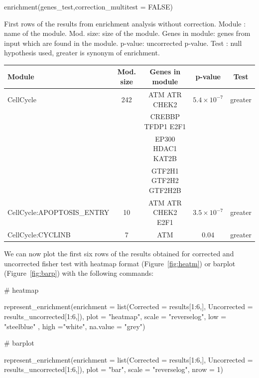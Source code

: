 \begin{example}
enrichment(genes_test,correction_multitest = FALSE)
\end{example}


\begin{widetable}[h!]
  \centering
  \caption{First rows of the results from enrichment analysis without correction.
  Module : name of the module. Mod. size: size of the module. Genes in module:
  genes from input which are found in the module. p-value: uncorrected p-value.
  Test : null hypothesis used, greater is synonym of enrichment.}
  \label{tab:table2}

  \begin{tabular}{l c c c c}
	\toprule
Module & Mod. size & Genes in module & p-value & Test\\
	\midrule
CellCycle & 242 & ATM ATR CHEK2 & $5.4 \times 10^{-7}$  & greater \\
		  &     & CREBBP TFDP1 E2F1 &  & \\
		  &     & EP300 HDAC1 KAT2B & & \\
		  &     & GTF2H1 GTF2H2 GTF2H2B &  &\\ 
  CellCycle:APOPTOSIS\_ENTRY & 10 & ATM ATR CHEK2 E2F1 & $3.5 \times 10^{-7}$  & greater \\ 
  CellCycle:CYCLINB & 7 & ATM & 0.04 & greater \\ 



	\bottomrule

	\end{tabular}
\end{widetable}

We can now plot the first six rows of the results obtained for corrected and
uncorrected fisher test with heatmap format (Figure~\ref{fig:heatm}) or barplot
(Figure~\ref{fig:barp}) with the following commands:

\begin{example}
# heatmap

represent_enrichment(enrichment = list(Corrected = results[1:6,], 
Uncorrected = results_uncorrected[1:6,]),
                                plot = "heatmap", scale = "reverselog", 
                                low = "steelblue" , high ="white", na.value = "grey")

# barplot 

 represent_enrichment(enrichment = list(Corrected = results[1:6,], 
                             Uncorrected = results_uncorrected[1:6,]),
                               plot = "bar", scale = "reverselog", 
                               nrow = 1)
\end{example}

